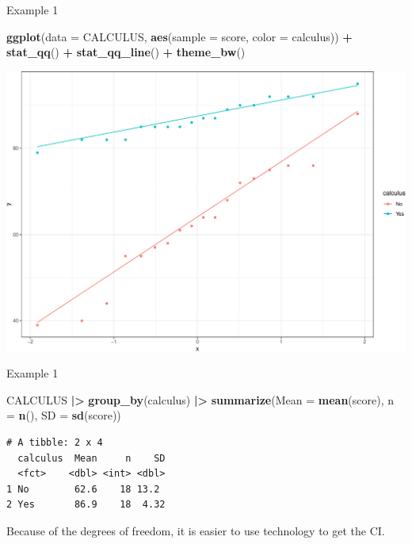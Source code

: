 \documentclass[
  ignorenonframetext,
]{beamer}
\newenvironment{Shaded}{\begin{snugshade}}{\end{snugshade}}
\newcommand{\AttributeTok}[1]{\textcolor[rgb]{0.13,0.29,0.53}{#1}}
\newcommand{\FunctionTok}[1]{\textcolor[rgb]{0.13,0.29,0.53}{\textbf{#1}}}
\newcommand{\NormalTok}[1]{#1}
\newcommand{\SpecialCharTok}[1]{\textcolor[rgb]{0.81,0.36,0.00}{\textbf{#1}}}
\begin{document}
\begin{frame}[fragile]{Example 1}
\protect\hypertarget{example-1-1}{}
\small

\begin{Shaded}
\begin{Highlighting}[]
\FunctionTok{ggplot}\NormalTok{(}\AttributeTok{data =}\NormalTok{ CALCULUS, }\FunctionTok{aes}\NormalTok{(}\AttributeTok{sample =}\NormalTok{ score, }\AttributeTok{color =}\NormalTok{ calculus)) }\SpecialCharTok{+} 
  \FunctionTok{stat\_qq}\NormalTok{() }\SpecialCharTok{+} 
  \FunctionTok{stat\_qq\_line}\NormalTok{() }\SpecialCharTok{+}
  \FunctionTok{theme\_bw}\NormalTok{()}
\end{Highlighting}
\end{Shaded}

\begin{center}\includegraphics[width=0.7\linewidth,height=0.5\textheight]{Week11_12_13_files/figure-beamer/unnamed-chunk-2-1} \end{center}
\normalsize
\end{frame}

\begin{frame}[fragile]{Example 1}
\protect\hypertarget{example-1-2}{}
\small

\begin{Shaded}
\begin{Highlighting}[]
\NormalTok{CALCULUS }\SpecialCharTok{|\textgreater{}} 
  \FunctionTok{group\_by}\NormalTok{(calculus) }\SpecialCharTok{|\textgreater{}} 
  \FunctionTok{summarize}\NormalTok{(}\AttributeTok{Mean =} \FunctionTok{mean}\NormalTok{(score), }\AttributeTok{n =} \FunctionTok{n}\NormalTok{(), }\AttributeTok{SD =} \FunctionTok{sd}\NormalTok{(score))}
\end{Highlighting}
\end{Shaded}

\begin{verbatim}
# A tibble: 2 x 4
  calculus  Mean     n    SD
  <fct>    <dbl> <int> <dbl>
1 No        62.6    18 13.2 
2 Yes       86.9    18  4.32
\end{verbatim}

\normalsize

Because of the degrees of freedom, it is easier to use technology to get
the CI.
\end{frame}
\end{document}
